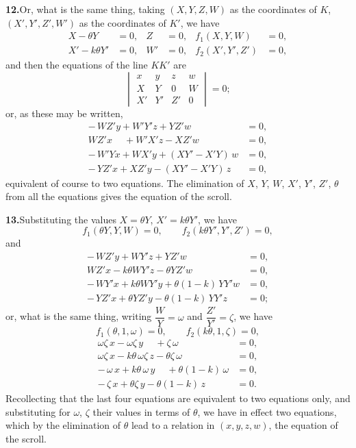 \documentclass[11pt,a4paper]{article}
\begin{document}
\textbf{12.}\quad Or, what is the same thing, taking $(X, Y, Z, W)$ as the
coordinates of $K$, $(X', Y', Z', W')$ as the coordinates of $K'$, we have
\begin{align*}
X - \theta Y &= 0, & Z &= 0, & f_{1}(X, Y, W) &= 0, \\
X' - k\theta Y' &= 0, & W' &= 0, & f_{2}(X', Y', Z') &= 0,
\end{align*}
and then the equations of the line $KK'$ are
\[
\begin{vmatrix}
 x & y & z & w \\
 X & Y & 0 & W \\
 X' & Y' & Z' & 0
\end{vmatrix} = 0;
\]
or, as these may be written,
\begin{align*}
-\,WZ' y + W'Y'z + Y\!Z' w &= 0, \\
WZ' x \phantom{-} + W'X' z - X\!Z' w &= 0, \\
-\,W'Y x + W X' y + (XY' - X'Y)\,w &= 0, \\
-\,YZ' x + X Z' y - (XY' - X'Y)\,z &= 0,
\end{align*}
equivalent of course to two equations. The elimination of $X$, $Y$, $W$, $X'$,
$Y'$, $Z'$, $\theta$ from all the equations gives the equation of the scroll.

\textbf{13.}\quad Substituting the values $X = \theta Y$, $X' = k\theta Y'$,
we have
\[
f_{1}(\theta Y, Y, W) = 0, \qquad f_{2}(k\theta Y', Y', Z') = 0,
\]
and
\begin{align*}
-\,WZ' y + W Y' z + Y\!Z' w &= 0, \\
WZ' x - k\theta W Y' z - \theta Y\!Z' w &= 0, \\
-\,W Y' x + k\theta W Y' y + \theta (1 - k)\,Y Y' w &= 0, \\
-\,YZ' x + \theta YZ' y - \theta (1 - k)\,Y Y' z &= 0;
\end{align*}
or, what is the same thing, writing $\dfrac{W}{Y} = \omega$ and
$\dfrac{Z'}{Y'} = \zeta$, we have
\[
f_{1}(\theta, 1, \omega) = 0, \qquad f_{2}(k\theta, 1, \zeta) = 0,
\]
\begin{align*}
\omega\zeta\, x - \omega\zeta\, y \phantom{+} + \zeta\,\omega &= 0, \\
\omega\zeta\, x - k\theta\,\omega\zeta\, z - \theta\zeta\,\omega &= 0, \\
-\,\omega\, x + k\theta\,\omega\, y \phantom{+} + \theta(1 - k)\,\omega &= 0, \\
-\,\zeta\, x + \theta\zeta\, y - \theta(1 - k)\, z &= 0.
\end{align*}
Recollecting that the last four equations are equivalent to two equations
only, and substituting for $\omega$, $\zeta$ their values in terms of $\theta$,
we have in effect two equations, which by the elimination of $\theta$ lead to a
relation in $(x, y, z, w)$, the equation of the scroll.
\end{document}
